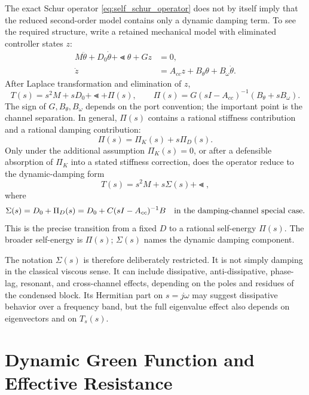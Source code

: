 The exact Schur operator \eqref{eq:self_schur_operator} does not by itself imply
that the reduced second-order model contains only a dynamic damping term. To see
the required structure, write a retained mechanical model with eliminated
controller states \(z\):
\begin{align}
  M\ddot\theta+D_0\dot\theta+\Lt\theta+Gz &=0,\\
  \dot z &= A_{cc}z+B_\theta\theta+B_\omega\dot\theta .
  \label{eq:self_structured_controller}
\end{align}
After Laplace transformation and elimination of \(z\),
\begin{equation}
  T(s)
  =
  s^2M+sD_0+\Lt+\Pi(s),
  \qquad
  \Pi(s)=G(sI-A_{cc})^{-1}(B_\theta+sB_\omega).
  \label{eq:self_general_pi}
\end{equation}
The sign of \(G,B_\theta,B_\omega\) depends on the port convention; the
important point is the channel separation. In general, \(\Pi(s)\) contains a
rational stiffness contribution and a rational damping contribution:
\begin{equation}
  \Pi(s)=\Pi_K(s)+s\Pi_D(s).
  \label{eq:self_pi_decomposition}
\end{equation}
Only under the additional assumption \(\Pi_K(s)=0\), or after a defensible
absorption of \(\Pi_K\) into a stated stiffness correction, does the operator
reduce to the dynamic-damping form
\begin{equation}
  T(s)=s^2M+s\Sigma(s)+\Lt,
  \label{eq:self_second_order}
\end{equation}
where
\begin{equation}
  \Sigma(s)=D_0+\Pi_D(s)
  =
  D_0+C(sI-A_{cc})^{-1}B
  \quad\hbox{in the damping-channel special case.}
  \label{eq:self_sigma_def}
\end{equation}
This is the precise transition from a fixed \(D\) to a rational
self-energy \(\Pi(s)\). The broader self-energy is \(\Pi(s)\);
\(\Sigma(s)\) names the dynamic damping component.

The notation \(\Sigma(s)\) is therefore deliberately restricted. It is not
simply damping in the classical viscous sense. It can include dissipative,
anti-dissipative, phase-lag, resonant, and cross-channel effects, depending on
the poles and residues of the condensed block. Its Hermitian part on
\(s=j\omega\) may suggest dissipative behavior over a frequency band, but the
full eigenvalue effect also depends on eigenvectors and on \(T_s(s)\).

\section{Dynamic Green Function and Effective Resistance}

